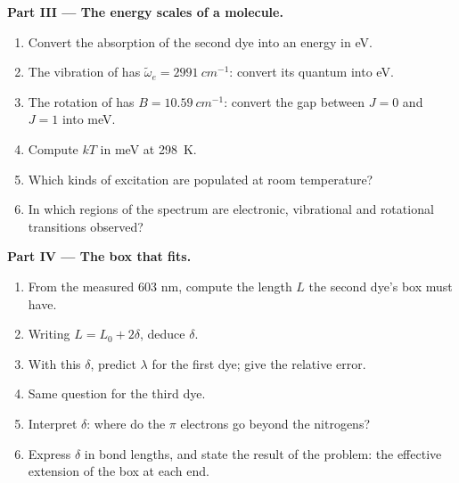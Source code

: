 \begin{problem}
\medskip\noindent\textbf{Part III --- The energy scales of a molecule.}
\begin{enumerate}[resume]
  \item Convert the absorption of the second dye into an energy in eV.
  \item The vibration of  has $\tilde\omega_e = \qty{2991}{cm^{-1}}$:
        convert its quantum into eV.
  \item The rotation of  has $B = \qty{10.59}{cm^{-1}}$: convert the
        gap between $J = 0$ and $J = 1$ into meV.
  \item Compute $kT$ in meV at \qty{298}{K}.
  \item Which kinds of excitation are populated at room temperature?
  \item In which regions of the spectrum are electronic, vibrational and
        rotational transitions observed?
\end{enumerate}

\medskip\noindent\textbf{Part IV --- The box that fits.}
\begin{enumerate}[resume]
  \item From the measured 603 nm, compute the length $L$ the second dye's
        box must have.
  \item Writing $L = L_0 + 2\delta$, deduce $\delta$.
  \item With this $\delta$, predict $\lambda$ for the first dye; give the
        relative error.
  \item Same question for the third dye.
  \item Interpret $\delta$: where do the $\pi$ electrons go beyond the
        nitrogens?
  \item Express $\delta$ in bond lengths, and state the result of the
        problem: the effective extension of the box at each end.
\end{enumerate}
\end{problem}
